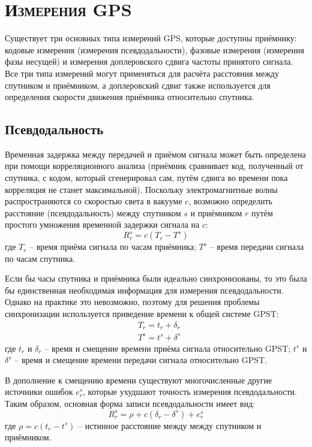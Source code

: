 \section{\textsc{Измерения GPS}}
\label{chap-1-3}

Существует три основных типа измерений GPS, которые доступны приёмнику: кодовые измерения (измерения псевдодальности), фазовые измерения (измерения фазы несущей) и измерения доплеровского сдвига частоты принятого сигнала.  
Все три типа измерений могут применяться для расчёта расстояния между спутником и приёмником, а доплеровский сдвиг также используется для определения скорости движения приёмника относительно спутника.

\subsection*{\textbf{Псевдодальность}}

Временная задержка между передачей и приёмом сигнала может быть определена при помощи корреляционного анализа (приёмник сравнивает код, полученный от спутника, с кодом, который сгенерировал сам, путём сдвига во времени пока корреляция не станет максимальной).
Поскольку электромагнитные волны распространяются со скоростью света в вакууме $c$, возможно определить расстояние (псевдодальность) между спутником $s$ и приёмником $r$ путём простого умножения временной задержки сигнала на $c$:
\begin{equation}
R_r^s=c(T_r-T^s)    
\end{equation}
где 
$T_r$ -- время приёма сигнала по часам приёмника;
$T^s$ -- время передачи сигнала по часам спутника. 

Если бы часы спутника и приёмника были идеально синхронизованы, то это была бы единственная необходимая информация для измерения псевдодальности.
Однако на практике это невозможно, поэтому для решения проблемы синхронизации используется приведение времени к общей системе GPST:
\begin{equation}
\begin{aligned}
&T_r=t_r+\delta_r \\
&T^s=t^s+\delta^s
\end{aligned}    
\end{equation}
где 
$t_r$ и $\delta_r$ -- время и смещение времени приёма сигнала относительно GPST;
$t^s$ и $\delta^s$ -- время и смещение времени передачи сигнала относительно GPST.   

В дополнение к смещению времени существуют многочисленные другие источники ошибок $e_r^s$, которые ухудшают точность измерения псевдодальности.
Таким образом, основная форма записи псевдодальности имеет вид:
\begin{equation}
\label{eq-pr}
R_r^s=\rho+c(\delta_r-\delta^s)+e_r^s    
\end{equation}
где 
$\rho=c(t_r-t^s)$ -- истинное расстояние между между спутником и приёмником.


